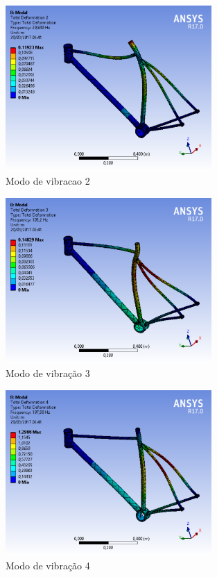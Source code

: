 		\graphicspath{{figuras/}}
			\begin{figure}[h!]
			\centering
			\includegraphics[width=0.7\textwidth]{modo_de_vibracao_2.png}
			\caption{Modo de vibracao 2}
			\label{img:modo_de_vibracao2}
			\end{figure}	
			
		\graphicspath{{figuras/}}
			\begin{figure}[h!]
			\centering
			\includegraphics[width=0.7\textwidth]{modo_de_vibracao_3.png}
			\caption{Modo de vibração 3}
			\label{img:modo_de_vibracao3}
			\end{figure}	
			
		\graphicspath{{figuras/}}
			\begin{figure}[h!]
			\centering
			\includegraphics[width=0.7\textwidth]{modo_de_vibracao_4.png}
			\caption{Modo de vibração 4}
			\label{img:modo_de_vibracao4}
			\end{figure}	
			
